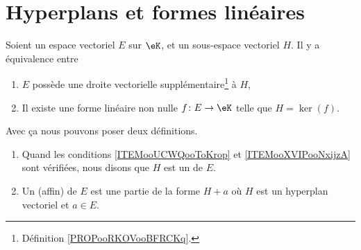 
\section{Hyperplans et formes linéaires}

\begin{propositionDef}      \label{DEFooEWDTooQbUQws}
	Soient un espace vectoriel \( E\) sur \( \eK\), et un sous-espace vectoriel \( H\). Il y a équivalence entre
	\begin{enumerate}
		\item		\label{ITEMooUCWQooToKrop}
		      \( E\) possède une droite vectorielle supplémentaire\footnote{Définition \ref{PROPooRKOVooBFRCKq}.} à \( H\),
		\item		\label{ITEMooXVIPooNxijzA}
		      Il existe une forme linéaire non nulle \(f \colon E\to \eK  \) telle que \( H=\ker(f)\).
	\end{enumerate}

	Avec ça nous pouvons poser deux définitions.
	\begin{enumerate}
		\item
		      Quand les conditions \ref{ITEMooUCWQooToKrop} et \ref{ITEMooXVIPooNxijzA} sont vérifiées, nous disons que \( H\) est un  de \( E\).
		\item
		      Un  (affin) de \( E\) est une partie de la forme \( H+a\) où \( H\) est un hyperplan vectoriel et \( a\in E\).
	\end{enumerate}
\end{propositionDef}

